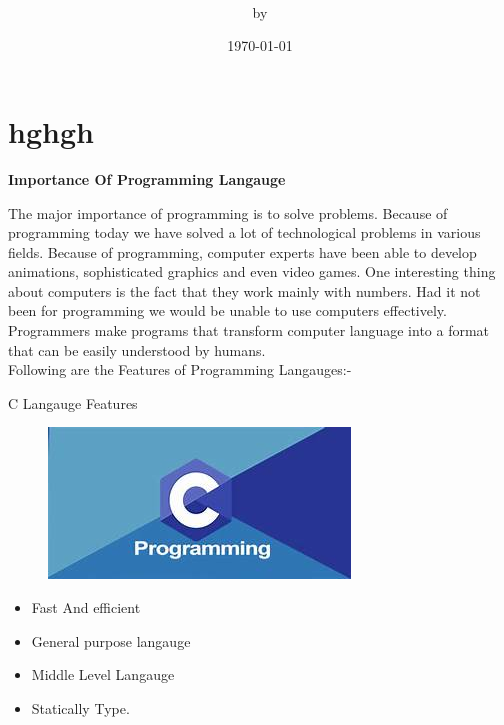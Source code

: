 \documentclass[compress,red,12pt]{beamer}
\begin{document}
\author[piyush chaple]{\\[5mm]\scriptsize by \\[5mm] \large \color{sky blue} }
       
\title{  }
\date{\today}





\section{hghgh}
\maketitle





\beginframe
\textbf{Importance Of Programming Langauge}\vspace{8pt}

The major importance of programming is to solve problems. Because of programming today we have solved a lot of technological problems in various fields.
\vspace{8pt}
Because of programming, computer experts have been able to develop animations, sophisticated graphics and even video games.
\vspace{8pt}
One interesting thing about computers is the fact that they work mainly with numbers. Had it not been for programming we would be unable to use computers effectively. Programmers make programs that transform computer language into a format that can be easily understood by humans.\\
\vspace{8pt}
\large Following are the Features of Programming Langauges:-
\endframe
\begin{frame}{ C Langauge Features}\pause
\begin{figure}
    \hfill
    \includegraphics[totalheight=1.0in]{c pr.jpg}
    
\end{figure}
\begin{itemize}

    \item \large Fast And efficient\pause
    \item \large General purpose langauge\pause
    \item \large Middle Level Langauge\pause
    \item  \large Statically Type.\pause
\end{itemize}
\end{frame}
\end{document}
